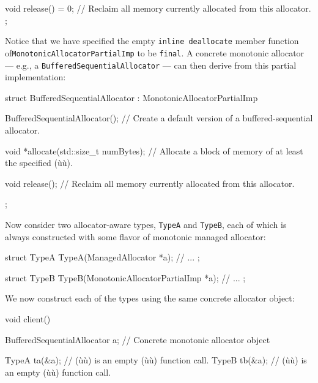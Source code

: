 {\begin{emcppslisting}[emcppsbatch=e7]
{    void release() = 0;
        // Reclaim all memory currently allocated from this allocator.
};
\end{emcppslisting}
    

\noindent Notice that we have specified the empty
\lstinline!inline!~\lstinline!deallocate! member function of\linebreak[4]
\lstinline!MonotonicAllocatorPartialImp! to be \lstinline!final!. A concrete
monotonic allocator --- e.g., a \lstinline!BufferedSequentialAllocator! ---
can then derive from this partial implementation:

\begin{emcppslisting}[emcppsbatch=e7]
struct BufferedSequentialAllocator : MonotonicAllocatorPartialImp
{
    BufferedSequentialAllocator();
        // Create a default version of a buffered-sequential allocator.

    void *allocate(std::size_t numBytes);
        // Allocate a block of memory of at least the specified (ù{}ù).

    void release();
        // Reclaim all memory currently allocated from this allocator.
};
\end{emcppslisting}
    

\noindent Now consider two allocator-aware types, \lstinline!TypeA! and
\lstinline!TypeB!, each of which is always constructed with some flavor of
monotonic managed allocator:

\begin{emcppslisting}[emcppsbatch=e7]
struct TypeA
{
    TypeA(ManagedAllocator *a);
    // ...
};

struct TypeB
{
    TypeB(MonotonicAllocatorPartialImp *a);
    // ...
};
\end{emcppslisting}
    

\enlargethispage{2ex}%
\noindent We now construct each of the types using the same concrete allocator
object:

\begin{emcppslisting}[emcppsbatch=e7]
void client()
{
    BufferedSequentialAllocator a;  // Concrete monotonic allocator object

    TypeA ta(&a);  // (ù{}ù) is an empty (ù{}ù) function call.
    TypeB tb(&a);  // (ù{}ù) is an empty (ù{}ù) function call.
}
\end{emcppslisting}
    

}
